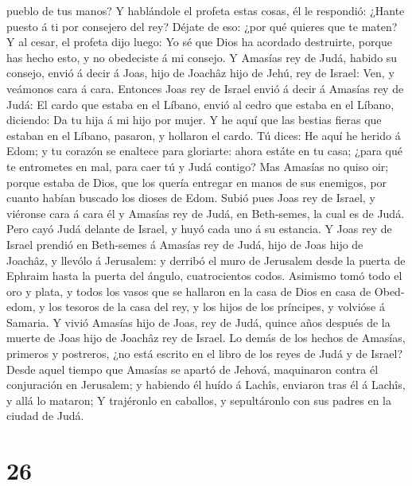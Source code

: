 pueblo de tus manos?  Y hablándole el profeta estas
cosas, él le respondió: ¿Hante puesto á ti por consejero del rey? Déjate
de eso: ¿por qué quieres que te maten? Y al cesar, el profeta dijo
luego: Yo sé que Dios ha acordado destruirte, porque has hecho esto, y
no obedeciste á mi consejo.  Y Amasías rey de Judá,
habido su consejo, envió á decir á Joas, hijo de Joachâz hijo de Jehú,
rey de Israel: Ven, y veámonos cara á cara.  Entonces
Joas rey de Israel envió á decir á Amasías rey de Judá: El cardo que
estaba en el Líbano, envió al cedro que estaba en el Líbano, diciendo:
Da tu hija á mi hijo por mujer. Y he aquí que las bestias fieras que
estaban en el Líbano, pasaron, y hollaron el cardo.  Tú
dices: He aquí he herido á Edom; y tu corazón se enaltece para
gloriarte: ahora estáte en tu casa; ¿para qué te entrometes en mal, para
caer tú y Judá contigo?  Mas Amasías no quiso oir; porque
estaba de Dios, que los quería entregar en manos de sus enemigos, por
cuanto habían buscado los dioses de Edom.  Subió pues
Joas rey de Israel, y viéronse cara á cara él y Amasías rey de Judá, en
Beth-semes, la cual es de Judá.  Pero cayó Judá delante
de Israel, y huyó cada uno á su estancia.  Y Joas rey de
Israel prendió en Beth-semes á Amasías rey de Judá, hijo de Joas hijo de
Joachâz, y llevólo á Jerusalem: y derribó el muro de Jerusalem desde la
puerta de Ephraim hasta la puerta del ángulo, cuatrocientos codos.
 Asimismo tomó todo el oro y plata, y todos los vasos que
se hallaron en la casa de Dios en casa de Obed-edom, y los tesoros de la
casa del rey, y los hijos de los príncipes, y volvióse á Samaria.
 Y vivió Amasías hijo de Joas, rey de Judá, quince años
después de la muerte de Joas hijo de Joachâz rey de Israel.
 Lo demás de los hechos de Amasías, primeros y postreros,
¿no está escrito en el libro de los reyes de Judá y de Israel?
 Desde aquel tiempo que Amasías se apartó de Jehová,
maquinaron contra él conjuración en Jerusalem; y habiendo él huído á
Lachîs, enviaron tras él á Lachîs, y allá lo mataron;  Y
trajéronlo en caballos, y sepultáronlo con sus padres en la ciudad de
Judá.

\hypertarget{section-25}{%
\section{26}\label{section-25}}

